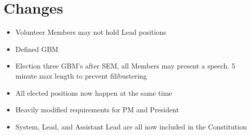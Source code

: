 \section{Changes}
\label{changes}
\begin{itemize}
\item Volunteer Members may not hold Lead positions
\item Defined GBM
\item Election three GBM's after SEM, all Members may present a speech. 5 minute max length to prevent filibustering
\item All elected positions now happen at the same time
\item Heavily modified requirements for PM and President
\item System, Lead, and Assistant Lead are all now included in the Constitution
\end{itemize}